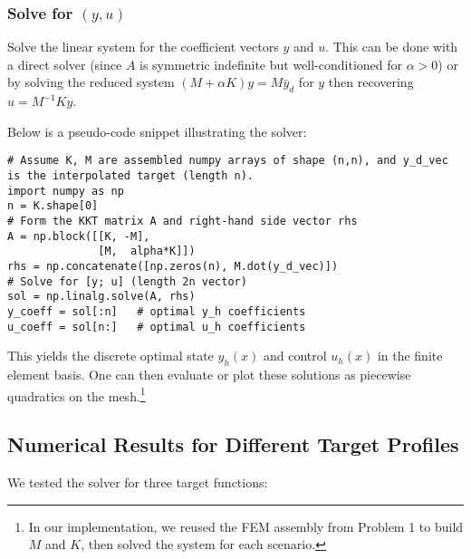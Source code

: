 \subsubsection{Solve for \((y,u)\)}
Solve the linear system for the coefficient vectors \(y\) and \(u\). This can be done with a direct solver (since \(A\) is symmetric indefinite but well-conditioned for \(\alpha>0\)) or by solving the reduced system \((M + \alpha K)y = M\bar y_d\) for \(y\) then recovering \(u = M^{-1}K y\).

Below is a pseudo-code snippet illustrating the solver:
\begin{verbatim}
# Assume K, M are assembled numpy arrays of shape (n,n), and y_d_vec is the interpolated target (length n).
import numpy as np
n = K.shape[0]
# Form the KKT matrix A and right-hand side vector rhs
A = np.block([[K, -M],
              [M,  alpha*K]])
rhs = np.concatenate([np.zeros(n), M.dot(y_d_vec)])
# Solve for [y; u] (length 2n vector)
sol = np.linalg.solve(A, rhs)
y_coeff = sol[:n]   # optimal y_h coefficients
u_coeff = sol[n:]   # optimal u_h coefficients
\end{verbatim}

This yields the discrete optimal state \(y_h(x)\) and control \(u_h(x)\) in the finite element basis. One can then evaluate or plot these solutions as piecewise quadratics on the mesh.\footnote{In our implementation, we reused the FEM assembly from Problem 1 to build \(M\) and \(K\), then solved the system for each scenario.}

\subsection{Numerical Results for Different Target Profiles}
We tested the solver for three target functions:

